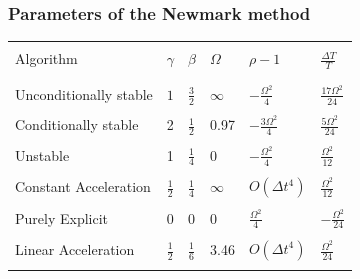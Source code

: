 \documentclass[xcolor=svgnames,9pt]{beamer}
\theoremstyle{remark}
\begin{document}
		\begin{frame}
		\centering
  			\frametitle{Parameters of the Newmark method}
				\begin{tabular}{| l | l | l | l | l | l |}
						\hline & & & & &\\
	Algorithm & $\gamma$ & $\beta$ & $\Omega$ & $\rho -1$ & $\frac{\Delta T}{T}$
						\\ & & & & &
						\\ \hline & & & & &\\
	Unconditionally stable & $1$ & $\frac{3}{2}$ & $\infty$ & $-\frac{\Omega^2}{4}$ & $\frac{17\Omega^2}{24}$
						\\ & & & & &\\
	Conditionally stable & 2 & $\frac{1}{2}$ & 0.97 &$-\frac{3 \Omega^2}{4}$ &  $\frac{5 \Omega^2}{24}$ 
						\\ & & & & &\\
	Unstable & 1 & $\frac{1}{4}$ & 0 & $-\frac{\Omega^2}{4}$ & $\frac{\Omega^2}{12}$ 
						\\ & & & & &\\
	Constant Acceleration & $\frac{1}{2}$ & $\frac{1}{4}$ & $\infty$ & $O(\Delta t^4)$ & $\frac{\Omega^2}{12}$ 
						\\ & & & & &\\
	Purely Explicit & 0 & 0 & 0 & $\frac{\Omega^2}{4}$ & $-\frac{\Omega^2}{24}$
						\\ & & & & &\\
	Linear Acceleration & $\frac{1}{2}$ & $\frac{1}{6}$ & 3.46 & $O(\Delta t^4)$ & $\frac{\Omega^2}{24}$
						\\ & & & & &\\ \hline
    					\end{tabular}
		\end{frame}
\end{document}
